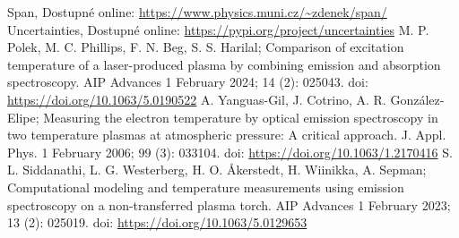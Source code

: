 \documentclass[a4paper,11pt]{article}
\begin{document}
                \begin{thebibliography}{9}
                        Span, Dostupné online: \url{https://www.physics.muni.cz/~zdenek/span/}
                        Uncertainties, Dostupné online: \url{https://pypi.org/project/uncertainties}
                        M. P. Polek, M. C. Phillips, F. N. Beg, S. S. Harilal; Comparison of excitation temperature of a laser-produced plasma by combining emission and absorption spectroscopy. AIP Advances 1 February 2024; 14 (2): 025043. doi: \url{https://doi.org/10.1063/5.0190522}
                        A. Yanguas-Gil, J. Cotrino, A. R. González-Elipe; Measuring the electron temperature by optical emission spectroscopy in two temperature plasmas at atmospheric pressure: A critical approach. J. Appl. Phys. 1 February 2006; 99 (3): 033104. doi: \url{https://doi.org/10.1063/1.2170416}
                        S. L. Siddanathi, L. G. Westerberg, H. O. Åkerstedt, H. Wiinikka, A. Sepman; Computational modeling and temperature measurements using emission spectroscopy on a non-transferred plasma torch. AIP Advances 1 February 2023; 13 (2): 025019. doi: \url{https://doi.org/10.1063/5.0129653}
                \end{thebibliography} 
\end{document}

